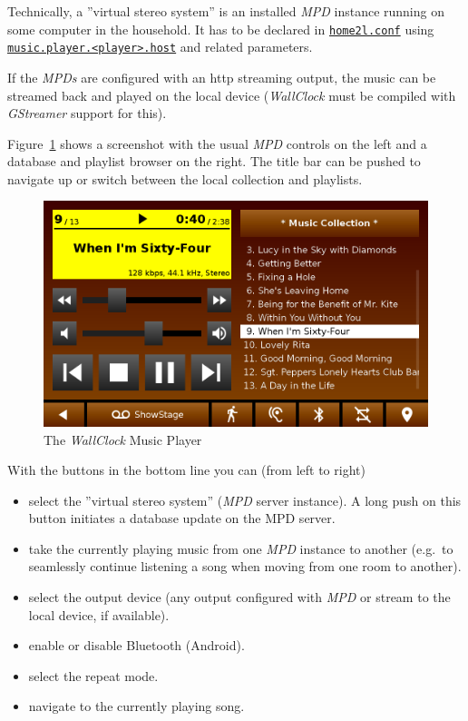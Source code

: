 \documentclass[12pt,english,parskip=half,headheight=19pt]{scrreprt}
\newcommand{\idx}[1]{#1\index{#1}}
\newcommand{\refenv}[1]{\hyperref[env:#1]{\texttt{#1}}}        %
\newcommand{\reftool}[1]{\hyperref[tool:#1]{\texttt{\idx{#1}}}}
\begin{document}
Technically, a ''virtual stereo system'' is an installed \textit{MPD}
instance running on some computer in the household. It has to be
declared in \reftool{home2l.conf} using \refenv{music.player.<player>.host}
and related parameters.

If the \textit{MPDs} are configured with an http streaming output, the
music can be streamed back and played on the local device (\textit{WallClock}
must be compiled with \textit{GStreamer} support for this).

Figure~\ref{fig:screen-wallclock-music} shows a screenshot
with the usual \textit{MPD} controls on the left and a database and
playlist browser on the right. The title bar can be pushed to navigate
up or switch between the local collection and playlists.

\begin{figure}[ht]
  \centering
  \includegraphics[width=0.7\linewidth]{figs/wallclock-music.png}
  \caption[l]{The \textit{WallClock} Music Player}
  \label{fig:screen-wallclock-music}
\end{figure}

With the buttons in the bottom line you can (from left to right)

\begin{itemize}
\item
  select the ''virtual stereo system'' (\textit{MPD} server instance).
  A long push on this button initiates a database update on the MPD server.
\item
  take the currently playing music from one \textit{MPD} instance to another
  (e.g.~to seamlessly continue listening a song when moving from one room to another).
\item
  select the output device (any output configured with \textit{MPD} or
  stream to the local device, if available).
\item
  enable or disable Bluetooth (Android).
\item
  select the repeat mode.
\item
  navigate to the currently playing song.
\end{itemize}
\end{document}
